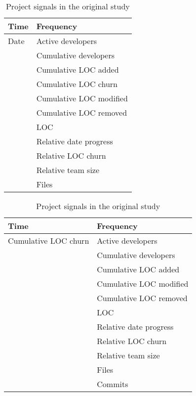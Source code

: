 \newcommand{\tableHeadSeries}{\bfseries{Time}\rm & \bfseries{Frequency}\rm}
\begin{table}[H]
\caption{Project signals in the original study}\label{table:karus_series}
\centering
\begin{tabular}{ll}
	\hline
	\tableHeadSeries \\
	\hline
	Date & Active developers \\
	& Cumulative developers \\
	& Cumulative LOC added \\
	& Cumulative LOC churn \\
	& Cumulative LOC modified \\
	& Cumulative LOC removed \\
	& LOC \\
	& Relative date progress \\
	& Relative LOC churn \\
	& Relative team size \\
	& Files \\
	\hline
\end{tabular}
\hspace{1em}
\begin{tabular}{ll}
	\hline
	\tableHeadSeries \\
	\hline
	Cumulative LOC churn & Active developers \\
	& Cumulative developers \\
	& Cumulative LOC added \\
	& Cumulative LOC modified \\
	& Cumulative LOC removed \\
	& LOC \\
	& Relative date progress \\
	& Relative LOC churn \\
	& Relative team size \\
	& Files \\
	& Commits \\
	\hline
\end{tabular}
\end{table}